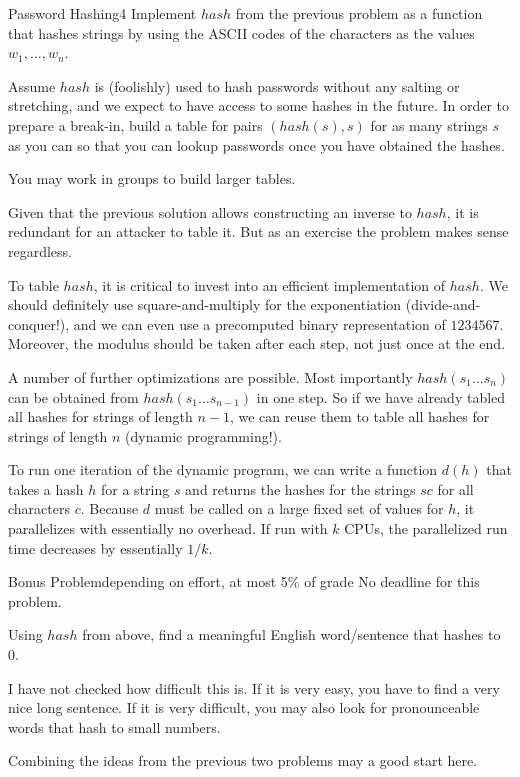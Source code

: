 \documentclass[a4paper]{article}
\begin{document}
\begin{problem}{Password Hashing}{4}
Implement $hash$ from the previous problem as a function that hashes strings by using the ASCII codes of the characters as the values $w_1,\ldots,w_n$.

Assume $hash$ is (foolishly) used to hash passwords without any salting or stretching, and we expect to have access to some hashes in the future.
In order to prepare a break-in, build a table for pairs $(hash(s),s)$ for as many strings $s$ as you can so that you can lookup passwords once you have obtained the hashes.

You may work in groups to build larger tables.

\begin{solution}
Given that the previous solution allows constructing an inverse to $hash$, it is redundant for an attacker to table it.
But as an exercise the problem makes sense regardless.

To table $hash$, it is critical to invest into an efficient implementation of $hash$.
We should definitely use square-and-multiply for the exponentiation (divide-and-conquer!), and we can even use a precomputed binary representation of $1234567$.
Moreover, the modulus should be taken after each step, not just once at the end.

A number of further optimizations are possible.
Most importantly $hash(s_1\ldots s_n)$ can be obtained from $hash(s_1\ldots s_{n-1})$ in one step.
So if we have already tabled all hashes for strings of length $n-1$, we can reuse them to table all hashes for strings of length $n$ (dynamic programming!).

To run one iteration of the dynamic program, we can write a function $d(h)$ that takes a hash $h$ for a string $s$ and returns the hashes for the strings $sc$ for all characters $c$.
Because $d$ must be called on a large fixed set of values for $h$, it parallelizes with essentially no overhead.
If run with $k$ CPUs, the parallelized run time decreases by essentially $1/k$.
\end{solution}
\end{problem}


\begin{problem}{Bonus Problem}{depending on effort, at most 5\% of grade}
No deadline for this problem.

Using $hash$ from above, find a meaningful English word/sentence that hashes to $0$.

I have not checked how difficult this is.
If it is very easy, you have to find a very nice long sentence.
If it is very difficult, you may also look for pronounceable words that hash to small numbers.

\begin{solution}
Combining the ideas from the previous two problems may a good start here.
\end{solution}
\end{problem}
\end{document}
